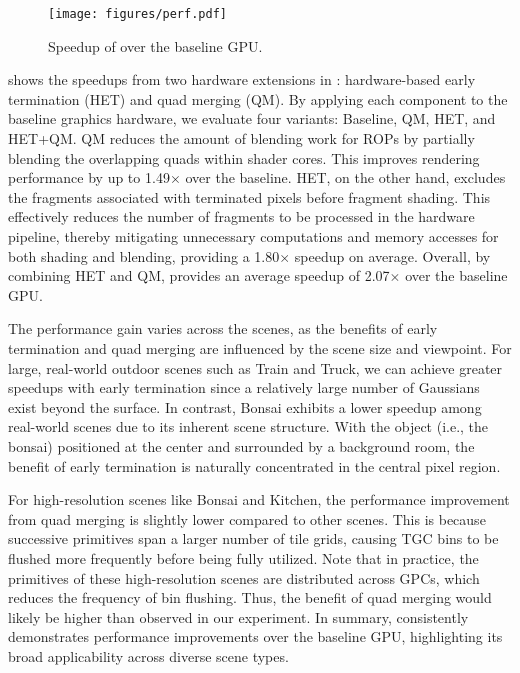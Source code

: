 


\begin{figure}[t]
  \centering
  \texttt{[image: figures/perf.pdf]}
  \caption{{Speedup of \name{} over the baseline GPU.}}
  \vspace{-0.20in}
  \label{fig:perf}
\end{figure}

 shows the speedups from two hardware extensions in \name{}:
hardware-based early termination (HET) and quad merging (QM). 
%
By applying each component to the baseline graphics hardware, we evaluate four
variants: Baseline, QM, HET, and HET+QM. 
%
QM reduces the amount of blending work for ROPs by partially blending the
overlapping quads within shader cores. 
%
This improves rendering performance by up to {1.49$\times$} over the baseline.
%
HET, on the other hand, excludes the fragments associated with terminated
pixels before fragment shading. This effectively reduces the number of
fragments to be processed in the hardware pipeline, thereby mitigating
unnecessary computations and memory accesses for both shading and blending,
providing a {1.80$\times$} speedup on average.
%
Overall, by combining HET and QM, \name{} provides an average speedup of
{2.07$\times$} over the baseline GPU.

The performance gain varies across the scenes, as the benefits of early
termination and quad merging are influenced by the scene size and viewpoint. 
%
For large, real-world outdoor scenes such as Train and Truck, we can achieve
greater speedups with early termination since a relatively large number of
Gaussians exist beyond the surface.
%
In contrast, Bonsai exhibits a lower speedup among real-world scenes due to its
inherent scene structure. With the object (i.e., the bonsai) positioned at the
center and surrounded by a background room, the benefit of early termination is
naturally concentrated in the central pixel region. 

For high-resolution scenes like Bonsai and Kitchen, the performance improvement
from quad merging is slightly lower compared to other scenes. This is because
successive primitives span a larger number of tile grids, causing TGC bins to
be flushed more frequently before being fully utilized.
%
Note that in practice, the primitives of these high-resolution scenes are
distributed across GPCs, which reduces the frequency of bin flushing.
%
Thus, the benefit of quad merging would likely be higher than observed in our
experiment.
%
In summary, \name{} consistently demonstrates performance improvements over the
baseline GPU, highlighting its broad applicability across diverse scene types.


